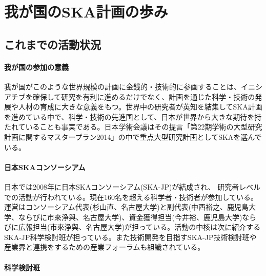 \setcounter{section}{2}\section{我が国のSKA計画の歩み}
\label{c01.s3}

\subsection{これまでの活動状況}
\label{c01.s3.ss1}

\paragraph{我が国の参加の意義}

我が国がこのような世界規模の計画に金銭的・技術的に参画することは、イニシアチブを確保して研究を有利に進めるだけでなく、計画を通じた科学・技術の発展や人材の育成に大きな意義をもつ。世界中の研究者が英知を結集してSKA計画を進めている中で、科学・技術の先進国として、日本が世界から大きな期待を持たれていることも事実である。日本学術会議はその提言「第22期学術の大型研究計画に関するマスタープラン2014」の中で重点大型研究計画としてSKAを選んでいる。

\paragraph{日本SKAコンソーシアム}

日本では2008年に日本SKAコンソーシアム(SKA-JP)が結成され、 研究者レベルでの活動が行われている。現在160名を超える科学者・技術者が参加している。運営はコンソーシアム代表(杉山直、名古屋大学)と副代表(中西裕之、鹿児島大学、ならびに市來浄與、名古屋大学)、資金獲得担当(今井裕、鹿児島大学)ならびに広報担当(市來浄與、名古屋大学)が担っている。活動の中核は次に紹介するSKA-JP科学検討班が担っている。また技術開発を目指すSKA-JP技術検討班や産業界と連携をするための産業フォーラムも組織されている。

\paragraph{科学検討班}

